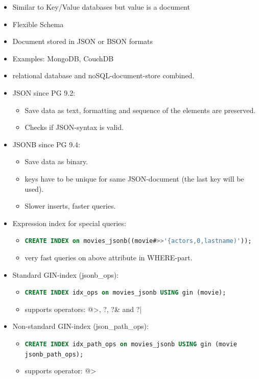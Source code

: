 \begin{breakbox}
\begin{itemize}
	\item Similar to Key/Value databases but value is a document
	\item Flexible Schema
	\item Document stored in JSON or BSON formats
	\item Examples: MongoDB, CouchDB
\end{itemize}
\end{breakbox}

\begin{breakbox}
\begin{itemize}
	\item relational database and noSQL-document-store combined.
	\item JSON since PG 9.2:
		\begin{itemize}
			\item Save data as text, formatting and sequence of the elements are preserved.
			\item Checks if JSON-syntax is valid.
		\end{itemize}
	\item JSONB since PG 9.4:
		\begin{itemize}
			\item Save data as binary.
			\item keys have to be unique for same JSON-document (the last key will be used).
			\item Slower inserts, faster queries.
		\end{itemize}
	\item Expression index for special queries:
		\begin{itemize}
			\item \lstinline[language=SQL]{CREATE INDEX on movies_jsonb((movie#>>'{actors,0,lastname)'));}
			\item very fast queries on above attribute in WHERE-part.
		\end{itemize}
	\item Standard GIN-index (jsonb\_ops):
		\begin{itemize}
			\item \lstinline[language=SQL]{CREATE INDEX idx_ops on movies_jsonb USING gin (movie);}
			\item supports operators: @>, ?, ?\& and ?|
		\end{itemize}
	\item Non-standard GIN-index (json\_path\_ops):
		\begin{itemize}
			\item \lstinline[language=SQL]{CREATE INDEX idx_path_ops on movies_jsonb USING gin (movie jsonb_path_ops);}
			\item supports operator: @>
		\end{itemize}
\end{itemize}
\end{breakbox}

